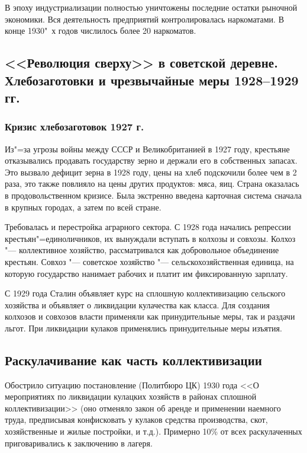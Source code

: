 В эпоху индустриализации полностью уничтожены последние остатки рыночной экономики. Вся деятельность предприятий контролировалась наркоматами. В конце 1930"~х годов числилось более 20 наркоматов.


\subsection{<<Революция сверху>> в советской деревне. Хлебозаготовки и чрезвычайные меры 1928--1929 гг.}

\subsubsection{Кризис хлебозаготовок 1927 г.}

Из"=за угрозы войны между СССР и Великобританией в 1927 году, крестьяне отказывались продавать государству зерно и держали его в собственных запасах. Это вызвало дефицит зерна в 1928 году, цены на хлеб подскочили более чем в 2 раза, это также повлияло на цены других продуктов: мяса, яиц. Страна оказалась в продовольственном кризисе. Была экстренно введена карточная система сначала в крупных городах, а затем по всей стране.

Требовалась и перестройка аграрного сектора. С 1928 года начались репрессии крестьян"=единоличников, их вынуждали вступать в колхозы и совхозы. Колхоз "--- коллективное хозяйство, рассматривался как добровольное объединение крестьян. Совхоз "--- советское хозяйство "--- сельскохозяйственная единица, на которую государство нанимает рабочих и платит им фиксированную зарплату.

С 1929 года Сталин объявляет курс на сплошную коллективизацию сельского хозяйства и объявляет о ликвидации кулачества как класса. Для создания колхозов и совхозов власти применяли как принудительные меры, так и раздачи льгот. При ликвидации кулаков применялись принудительные меры изъятия.

\subsection{Раскулачивание как часть коллективизации}

Обострило ситуацию постановление (Политбюро ЦК) 1930 года <<О мероприятиях по ликвидации кулацких хозяйств в районах сплошной коллективизации>> (оно отменяло закон об аренде и применении наемного труда, предписывая конфисковать у кулаков средства производства, скот, хозяйственные и жилые постройки, и т.д.). Примерно 10\% от всех раскулаченных приговаривались к заключению в лагеря.

